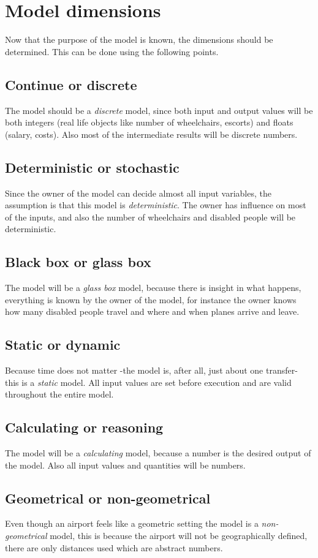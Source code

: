 \documentclass[a4paper, 11pt, notitlepage]{report}
\begin{document}
\section{Model dimensions}
Now that the purpose of the model is known, the dimensions should be determined. This can be done using the following points.
\subsection{Continue or discrete}
The model should be a \emph{discrete} model, since both input and output values will be both integers (real life objects like number of wheelchairs, escorts) and floats (salary, costs). Also most of the intermediate results will be discrete numbers.
\subsection{Deterministic or stochastic}
Since the owner of the model can decide almost all input variables, the assumption is that this model is \emph{deterministic}. The owner has influence on most of the inputs, and also the number of wheelchairs and disabled people will be deterministic.
\subsection{Black box or glass box}
The model will be a \emph{glass box} model, because there is insight in what happens, everything is known by the owner of the model, for instance the owner knows how many disabled people travel and where and when planes arrive and leave.
\subsection{Static or dynamic}
Because time does not matter -the model is, after all, just about one transfer- this is a \emph{static} model. All input values are set before execution and are valid throughout the entire model.
\subsection{Calculating or reasoning}
The model will be a \emph{calculating} model, because a number is the desired output of the model. Also all input values and quantities will be numbers.
\subsection{Geometrical or non-geometrical}
Even though an airport feels like a geometric setting the model is a \emph{non-geometrical} model, this is because the airport will not be geographically defined, there are only distances used which are abstract numbers.
\end{document}
